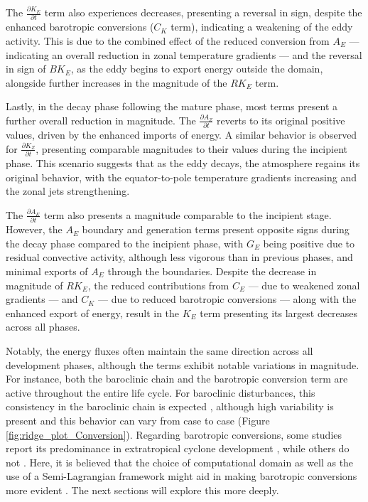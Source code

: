 The $\frac{\partial K_E}{\partial t}$ term also experiences decreases, presenting a reversal in sign, despite the enhanced barotropic conversions ($C_K$ term), indicating a weakening of the eddy activity. This is due to the combined effect of the reduced conversion from $A_E$ — indicating an overall reduction in zonal temperature gradients — and the reversal in sign of $BK_E$, as the eddy begins to export energy outside the domain, alongside further increases in the magnitude of the $RK_E$ term.

Lastly, in the decay phase following the mature phase, most terms present a further overall reduction in magnitude. The $\frac{\partial A_Z}{\partial t}$ reverts to its original positive values, driven by the enhanced imports of energy. A similar behavior is observed for $\frac{\partial K_Z}{\partial t}$, presenting comparable magnitudes to their values during the incipient phase. This scenario suggests that as the eddy decays, the atmosphere regains its original behavior, with the equator-to-pole temperature gradients increasing and the zonal jets strengthening.

The $\frac{\partial A_E}{\partial t}$ term also presents a magnitude comparable to the incipient stage. However, the $A_E$ boundary and generation terms present opposite signs during the decay phase compared to the incipient phase, with $G_E$ being positive due to residual convective activity, although less vigorous than in previous phases, and minimal exports of $A_E$ through the boundaries. Despite the decrease in magnitude of $RK_E$, the reduced contributions from $C_E$ — due to weakened zonal gradients — and $C_K$ — due to reduced barotropic conversions — along with the enhanced export of energy, result in the $K_E$ term presenting its largest decreases across all phases.

Notably, the energy fluxes often maintain the same direction across all development phases, although the terms exhibit notable variations in magnitude. For instance, both the baroclinic chain and the barotropic conversion term are active throughout the entire life cycle. For baroclinic disturbances, this consistency in the baroclinic chain is expected \citep[e.g.,]{pezza2010environmental,dias2011energy,black2013universal}, although high variability is present and this behavior can vary from case to case (Figure \ref{fig:ridge_plot_Conversion}). Regarding barotropic conversions, some studies report its predominance in extratropical cyclone development \citep[e.g.,]{michaelides1987limited,wahab2002mechanism,bulic2006limited,cavicchia2018energetics}, while others do not \citep[e.g.,]{pezza2010environmental,dias2011energy}. Here, it is believed that the choice of computational domain as well as the use of a Semi-Lagrangian framework might aid in making barotropic conversions more evident \citep{michaelides1999quasi}. The next sections will explore this more deeply.

